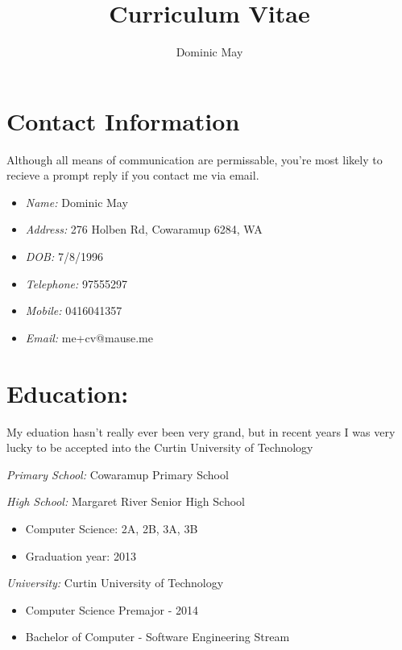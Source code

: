 \documentclass{article}
\begin{document}
\title{Curriculum Vitae}
\author{Dominic May}

\maketitle
\tableofcontents
\newpage

\section{Contact Information}
  Although all means of communication are permissable, you're most likely to
  recieve a prompt reply if you contact me via email.
  \begin{itemize}
    \item \emph{Name:} Dominic May

    \item \emph{Address:} 276 Holben Rd, Cowaramup 6284, WA

    \item \emph{DOB:} 7/8/1996

    \item \emph{Telephone:} 97555297

    \item \emph{Mobile:} 0416041357

    \item \emph{Email:} me+cv@mause.me
  \end{itemize}

\section{Education:}
  My eduation hasn't really ever been very grand, but in recent years I was
  very lucky to be accepted into the Curtin University of Technology

  \emph{Primary School:} Cowaramup Primary School

  \emph{High School:} Margaret River Senior High School
  \begin{itemize}
    \item Computer Science: 2A, 2B, 3A, 3B
    \item Graduation year: 2013
  \end{itemize}

  \emph{University:} Curtin University of Technology
  \begin{itemize}
    \item Computer Science Premajor - 2014
    \item Bachelor of Computer - Software Engineering Stream
  \end{itemize}
\end{document}
